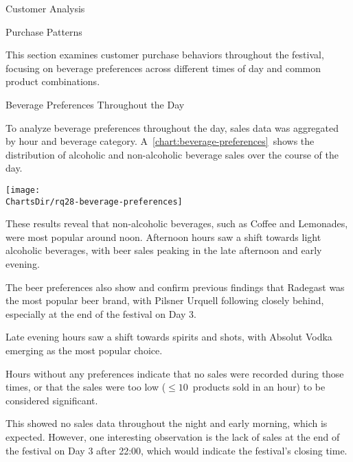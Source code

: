\begin{section}{Customer Analysis}
	\begin{subsection}{Purchase Patterns}
		\label{subsec:analysis-customer-purchase-pattern}

		This section examines customer purchase behaviors throughout the festival, focusing on beverage preferences across different times of day and common product combinations.

		\begin{subsubsection}{Beverage Preferences Throughout the Day}
			\label{subsubsec:analysis-beverage-preferences}


			To analyze beverage preferences throughout the day, sales data was aggregated by hour and beverage category.
			A~\autoref{chart:beverage-preferences}~shows the distribution of alcoholic and non-alcoholic beverage sales over the course of the day.

			\begin{chart}[h]
				\centering
				\texttt{[image: \\ChartsDir/rq28-beverage-preferences]}
				\caption{ Beverage Preferences Throughout the Day}
				\label{chart:beverage-preferences}
				\source
			\end{chart}

			These results reveal that non-alcoholic beverages, such as Coffee and Lemonades, were most popular around noon.
			Afternoon hours saw a shift towards light alcoholic beverages, with beer sales peaking in the late afternoon and early evening.

			The beer preferences also show and confirm previous findings that Radegast was the most popular beer brand, with Pilsner Urquell following closely behind, especially at the end of the festival on Day 3.

			Late evening hours saw a shift towards spirits and shots, with Absolut Vodka emerging as the most popular choice.

			Hours without any preferences indicate that no sales were recorded during those times, or that the sales were too low (\(\leq 10\)~products sold in an hour) to be considered significant.

			This showed no sales data throughout the night and early morning, which is expected.
			However, one interesting observation is the lack of sales at the end of the festival on Day 3 after 22:00, which would indicate the festival's closing time.


\end{subsubsection}
\end{subsection}
\end{section}
